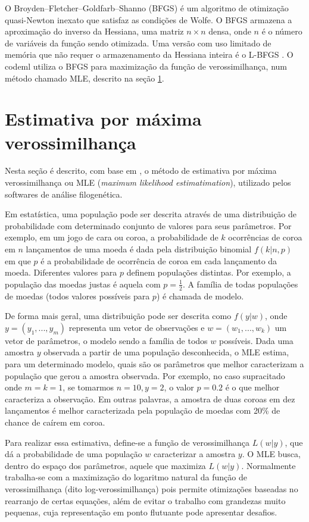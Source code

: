 \documentclass[cic,tc]{iiufrgs}
\begin{document}
O Broyden–Fletcher–Goldfarb–Shanno (BFGS) \cite{fletcher1980practical} é um
algoritmo de otimização quasi-Newton inexato que satisfaz as condições de
Wolfe. O BFGS armazena a aproximação do inverso da Hessiana, uma matriz $n
\times n$ densa, onde $n$ é o número de variáveis da função sendo otimizada.
Uma versão com uso limitado de memória que não requer o armazenamento da
Hessiana inteira é o L-BFGS \cite{liu1989limited}. O codeml utiliza o BFGS para
maximização da função de verossimilhança, num método chamado MLE, descrito na
seção \ref{sec:mle}.

\section{Estimativa por máxima verossimilhança}
\label{sec:mle}

Nesta seção é descrito, com base em \cite{myung2003tutorial}, o método de
estimativa por máxima verossimilhança ou MLE (\textit{maximum likelihood
estimatimation}), utilizado pelos softwares de análise filogenética.

Em estatística, uma população pode ser descrita através de uma distribuição de
probabilidade com determinado conjunto de valores para seus parâmetros.
Por exemplo, em um jogo de cara ou coroa, a probabilidade de $k$ ocorrências de
coroa em $n$ lançamentos de uma moeda é dada pela distribuição binomial
$f(k|n,p)$ em que $p$ é a probabilidade de ocorrência de coroa em cada
lançamento da moeda. Diferentes valores para $p$ definem populações distintas.
Por exemplo, a população das moedas justas é aquela com $p = \frac{1}{2}$. A
família de todas populações de moedas (todos valores possíveis para $p$) é
chamada de modelo.

De forma mais geral, uma distribuição pode ser descrita como $f(y|w)$, onde $y
= (y_1, ..., y_m)$ representa um vetor de observações e $w = (w_1, ..., w_k)$
um vetor de parâmetros, o modelo sendo a família de todos $w$ possíveis. Dada
uma amostra $y$ observada a partir de uma população desconhecida, o MLE estima,
para um determinado modelo, quais são os parâmetros que melhor caracterizam a
população que gerou a amostra observada. Por exemplo, no caso supracitado
onde $m = k = 1$, se tomarmos $n = 10, y = 2$, o valor $p = 0.2$ é o que melhor
caracteriza a observação. Em outras palavras, a amostra de duas coroas em dez
lançamentos é melhor caracterizada pela população de moedas com 20\% de chance
de caírem em coroa.

Para realizar essa estimativa, define-se a função de verossimilhança $L(w|y)$,
que dá a probabilidade de uma população $w$ caracterizar a amostra $y$. O MLE
busca, dentro do espaço dos parâmetros, aquele que maximiza $L(w|y)$.
Normalmente trabalha-se com a maximização do logaritmo natural da função de
verossimilhança (dito log-verossimilhança) pois permite otimizações baseadas no
rearranjo de certas equações, além de evitar o trabalho com grandezas muito
pequenas, cuja representação em ponto flutuante pode apresentar desafios. 
\end{document}
